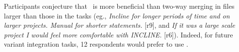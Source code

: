 Participants conjecture that \tooln~is more beneficial than two-way merging in files larger than those in the tasks (eg., \textit{\bc Incline for longer periods of time and on larger projects. Manual for shorter statements.\ec} [r9], and \textit{\bc If it was a large scale project I would feel more comfortable with INCLINE.\ec} [r6]). Indeed, for future variant integration tasks, 12 respondents would prefer to use \tooln.




